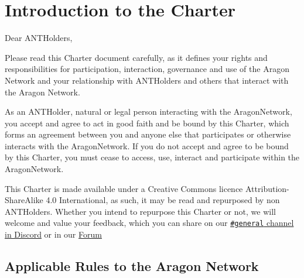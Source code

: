 
\chapter{Introduction to the Charter}
\label{chap:Introduction}
\restartnumbering

Dear \glspl{ANTHolder},

Please read this Charter document carefully, as it defines your rights and responsibilities for participation, interaction, governance and use of the Aragon Network and your relationship with \glspl{ANTHolder} and others that interact with the Aragon Network.

As an \gls{ANTHolder}, natural or legal person interacting with the \gls{AragonNetwork}, you accept and agree to act in good faith and be bound by this Charter, which forms an agreement between you and anyone else that participates or otherwise interacts with the \gls{AragonNetwork}.
If you do not accept and agree to be bound by this Charter, you must cease to access, use, interact and participate within the \gls{AragonNetwork}.

This Charter is made available under a Creative Commons licence Attribution-Share\-Alike 4.0 International, as such, it may be read and repurposed by non \glspl{ANTHolder}.
Whether you intend to repurpose this Charter or not, we will welcome and value your feedback, which you can share on our \href{https://discord.com/invite/eqQJkdp}{\texttt{\#general} channel in Discord} or in our \href{https://forum.aragon.org/}{Forum} 


\section{Applicable Rules to the Aragon Network}

